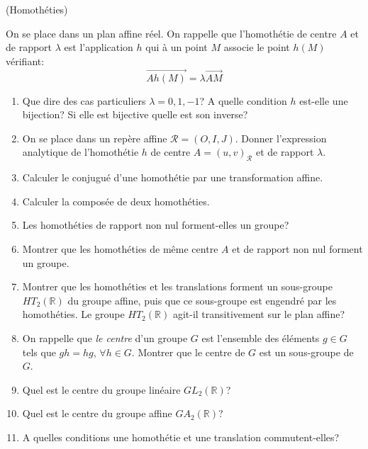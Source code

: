 \documentclass[a4paper,12pt,reqno]{amsart}
\begin{document}
\begin{exo} (Homothéties)

  On se place dans un plan affine réel. On rappelle que l'homothétie de centre $A$ et de rapport $\lambda$ est l'application $h$ qui à un point $M$ associe le point $h(M)$ vérifiant:
    \[
      \overrightarrow{Ah(M)}=\lambda\overrightarrow{AM}
    \]

  \begin{enumerate}
    \item Que dire des cas particuliers $\lambda=0,1,-1$? A quelle condition $h$ est-elle une bijection? Si elle est bijective quelle est son inverse?

    \item On se place dans un repère affine $\mathcal{R}=(O,I,J)$. Donner l'expression analytique de l'homothétie $h$ de centre $A=(u,v)_{\mathcal{R}}$ et de rapport $\lambda$.

    \item Calculer le conjugué d'une homothétie par une transformation affine.

    \item Calculer la composée de deux homothéties.

    \item Les homothéties de rapport non nul forment-elles un groupe?

    \item Montrer que les homothéties de même centre $A$ et de rapport non nul forment un groupe.

    \item Montrer que les homothéties et les translations forment un sous-groupe $HT_2(\mathbb{R})$ du groupe affine, puis que ce sous-groupe est engendré par les homothéties. Le groupe $HT_2(\mathbb{R})$ agit-il transitivement sur le plan affine?

    \item On rappelle que \textit{le centre} d'un groupe $G$ est l'ensemble des éléments $g\in G$ tels que $gh=hg$, $\forall h\in G$. Montrer que le centre de $G$ est un sous-groupe de $G$.

    \item Quel est le centre du groupe linéaire $GL_{2}(\mathbb{R})$?

    \item Quel est le centre du groupe affine $GA_{2}(\mathbb{R})$?

    \item A quelles conditions une homothétie et une translation commutent-elles?
  \end{enumerate}
\end{exo}
\end{document}
